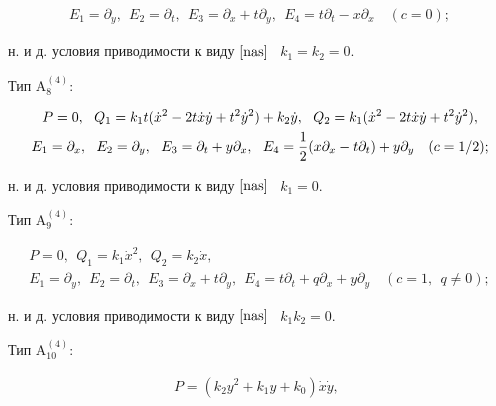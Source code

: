 \begin{thms}
\begin{gather*}
E_1=\partial_y,\ \ E_2=\partial_ t,\ \


E_3=\partial_ x+t\partial_y,\ \


E_4=t\partial_t-x\partial_x\quad (c=0);


\end{gather*}


н. и д. условия приводимости к виду $\eqref{nas}$ \ $k_1=k_2=0$.





Тип $\mathrm{A^{(4)}_8}{:}$


\begin{gather*}


P=0,\ \ Q_1={ k_1}t(\Dot x ^2-2t{ \Dot x}{ \Dot y}+t^2\Dot y^2)+k_2 \Dot y,


\ \ Q_2={ k_1}(\Dot x ^2-2t{ \Dot x}{ \Dot y}+t^2\Dot y^2), \\


E_1=\partial_x,\ \ E_2=\partial_ y,\ \


E_3=\partial_t+y\partial_ x,\ \


E_4={1\over 2}(x\partial_x-t\partial_t)+y\partial_y\quad (c=1/2);


\end{gather*}


н. и д. условия приводимости к виду $\eqref{nas}$ \ $k_1=0$.





Тип $\mathrm{A^{(4)}_9}{:}$


\begin{gather*}


P=0,\ \ Q_1= { k_1}\Dot x ^2,\ \ Q_2={ k_2}\Dot x, \\


E_1=\partial_y,\ \ E_2=\partial_ t,\ \


E_3=\partial_x+t\partial_ y,\ \


E_4=t\partial_t+q\partial_x+y\partial_y\quad (c=1,\ \ q\neq 0);


\end{gather*}


н. и д. условия приводимости к виду $\eqref{nas}$ \ $k_1k_2=0$.





Тип $\mathrm{A^{(4)}_{10}}{:}$


\begin{gather*}


P= ( { k_2}y^{2} + { k_1}y + { k_0}){ \Dot x}{ \Dot y},\ \



\end{gather*}
\end{thms}
